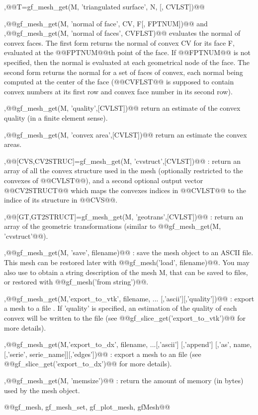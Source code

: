 \begin{cmddescription}
  \sep{@@T=gf_mesh_get(M, 'triangulated surface', N, [, CVLST])@@} 
  
  \sep{@@gf_mesh_get(M, 'normal of face', CV, F[, FPTNUM])@@} and
  \sep{@@gf_mesh_get(M, 'normal of faces', CVFLST)@@} evaluates the
  normal of convex faces. The first form returns the normal of convex
  CV for its face F, evaluated at the @@FPTNUM@@th point of the face.
  If @@FPTNUM@@ is not specified, then the normal is evaluated at each
  geometrical node of the face.  The second form returns the normal
  for a set of faces of convex, each normal being computed at the
  center of the face (@@CVFLST@@ is supposed to contain convex numbers
  at its first row and convex face number in its second row).


  \sep{@@gf_mesh_get(M, 'quality',[CVLST])@@} return an estimate of the convex quality (in a finite element sense).

  \sep{@@gf_mesh_get(M, 'convex area',[CVLST])@@} return an estimate the convex areas.
  
  \sep{@@[CVS,CV2STRUC]=gf_mesh_get(M, 'cvstruct',[CVLST])@@} :
   return an array of all the convex structure
  used in the mesh (optionally restricted to the convexes of
  @@CVLST@@), and a second optional output vector @@CV2STRUCT@@ which
  maps the convexes indices in @@CVLST@@ to the indice of its
  structure in @@CVS@@.

  \sep{@@[GT,GT2STRUCT]=gf_mesh_get(M, 'geotrans',[CVLST])@@} :
   return an array of the geometric
  transformations (similar to @@gf_mesh_get(M, 'cvstruct'@@).

  \sep{@@gf\_mesh\_get(M, 'save', filename)@@} : save the mesh object to
  an ASCII file. This mesh can be restored later with
  @@gf\_mesh('load', filename)@@.  You may also use  to obtain a string description of the mesh M, that can be
  saved to files, or restored with @@gf_mesh('from string')@@.
  
  \sep{@@gf_mesh_get(M,'export_to_vtk', filename, ... [,'ascii'][,'quality'])@@} :
  export a mesh to a \VTK file .   If 'quality' is specified, an estimation of
  the quality of each convex will be written to the file (see @@gf_slice_get('export_to_vtk')@@ for more details).

  \sep{@@gf_mesh_get(M,'export_to_dx', filename, ...[,'ascii'] [,'append'] [,'as', name,[,'serie', serie_name]][,'edges'])@@} :
  export a mesh to an \OpenDX file (see @@gf_slice_get('export_to_dx')@@ for more details).

  \sep{@@gf_mesh_get(M, 'memsize')@@} : return the amount of memory (in bytes) used by
  the mesh object.
\end{cmddescription}
\begin{gfseealso}
  @@gf\_mesh, gf\_mesh\_set, gf_plot_mesh, gfMesh@@
\end{gfseealso}
\newpage


